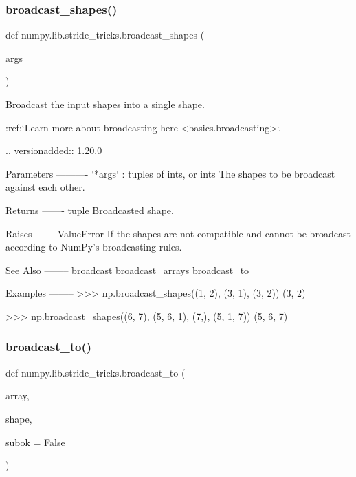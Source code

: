 \subsubsection{\texorpdfstring{broadcast\+\_\+shapes()}{broadcast\_shapes()}}
{\footnotesize\ttfamily def numpy.\+lib.\+stride\+\_\+tricks.\+broadcast\+\_\+shapes (\begin{DoxyParamCaption}\item[{}]{args }\end{DoxyParamCaption})}

\begin{DoxyVerb}Broadcast the input shapes into a single shape.

:ref:`Learn more about broadcasting here <basics.broadcasting>`.

.. versionadded:: 1.20.0

Parameters
----------
`*args` : tuples of ints, or ints
    The shapes to be broadcast against each other.

Returns
-------
tuple
    Broadcasted shape.

Raises
------
ValueError
    If the shapes are not compatible and cannot be broadcast according
    to NumPy's broadcasting rules.

See Also
--------
broadcast
broadcast_arrays
broadcast_to

Examples
--------
>>> np.broadcast_shapes((1, 2), (3, 1), (3, 2))
(3, 2)

>>> np.broadcast_shapes((6, 7), (5, 6, 1), (7,), (5, 1, 7))
(5, 6, 7)
\end{DoxyVerb}
 \mbox{\label{namespacenumpy_1_1lib_1_1stride__tricks_a7c24abd99f5e1487018c2217209be0d3}} 
\subsubsection{\texorpdfstring{broadcast\+\_\+to()}{broadcast\_to()}}
{\footnotesize\ttfamily def numpy.\+lib.\+stride\+\_\+tricks.\+broadcast\+\_\+to (\begin{DoxyParamCaption}\item[{}]{array,  }\item[{}]{shape,  }\item[{}]{subok = {\ttfamily False} }\end{DoxyParamCaption})}

